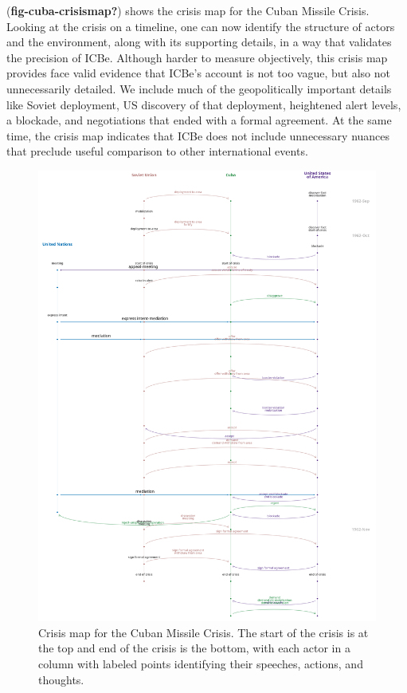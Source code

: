 \documentclass{article}
\begin{document}
(\textbf{fig-cuba-crisismap?}) shows the crisis map for the Cuban
Missile Crisis. Looking at the crisis on a timeline, one can now
identify the structure of actors and the environment, along with its
supporting details, in a way that validates the precision of ICBe.
Although harder to measure objectively, this crisis map provides face
valid evidence that ICBe's account is not too vague, but also not
unnecessarily detailed. We include much of the geopolitically important
details like Soviet deployment, US discovery of that deployment,
heightened alert levels, a blockade, and negotiations that ended with a
formal agreement. At the same time, the crisis map indicates that ICBe
does not include unnecessary nuances that preclude useful comparison to
other international events.

\begin{figure}
\hypertarget{fig-cuba-crisismap}{%
\centering
\includegraphics{p_196_icbe.png}
\caption{Crisis map for the Cuban Missile Crisis. The start of the
crisis is at the top and end of the crisis is the bottom, with each
actor in a column with labeled points identifying their speeches,
actions, and thoughts.}\label{fig-cuba-crisismap}
}
\end{figure}
\end{document}
